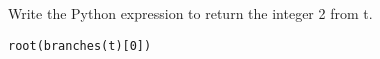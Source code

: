 \begin{blocksection}
\question Write the Python expression to return the integer 2 from t.

\begin{solution}
\begin{lstlisting}
root(branches(t)[0])
\end{lstlisting}
\end{solution}
\end{blocksection}
